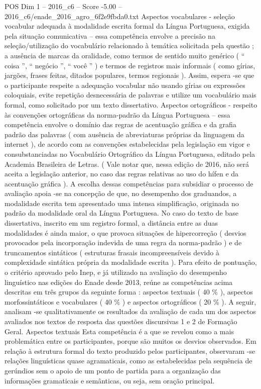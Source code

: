\begin{textsample}{POS Dim 1 – 2016\_c6 – Score -5.00 – 2016\_c6/enade\_2016\_agro\_6f2e9fbda0.txt}
Aspectos vocabulares - seleção vocabular adequada à modalidade escrita formal da Língua Portuguesa, exigida pela situação comunicativa – essa competência envolve a precisão na seleção/utilização do vocabulário relacionado à temática solicitada pela questão ; a ausência de marcas da oralidade, como termos de sentido muito genérico ( “ coisa ”, “ negócio ”, “ você ” ) e termos de registros mais informais ( como gírias, jargões, frases feitas, ditados populares, termos regionais ).
Assim, espera -se que o participante respeite a adequação vocabular não usando gírias ou expressões coloquiais, evite repetição desnecessária de palavras e utilize um vocabulário mais formal, como solicitado por um texto dissertativo.
Aspectos ortográficos - respeito às convenções ortográficas da norma-padrão da Língua Portuguesa – essa competência envolve o domínio das regras de acentuação gráfica e da grafia padrão das palavras ( com ausência de abreviaturas próprias da linguagem da internet ), de acordo com as convenções estabelecidas pela legislação em vigor e consubstanciadas no Vocabulário Ortográfico da Língua Portuguesa, editado pela Academia Brasileira de Letras. ( Vale notar que, nessa edição de 2016, não será aceita a legislação anterior, no caso das regras relativas ao uso do hífen e da acentuação gráfica ).
A escolha dessas competências para subsidiar o processo de avaliação apoia -se na concepção de que, no desempenho dos graduandos, a modalidade escrita tem apresentado uma intensa simplificação, originada no padrão da modalidade oral da Língua Portuguesa.
No caso do texto de base dissertativa, inscrito em um registro formal, a distância entre as duas modalidades é ainda maior, o que provoca situações de hipercorreção ( desvios provocados pela incorporação indevida de uma regra da norma-padrão ) e de truncamentos sintáticos ( estruturas frasais incompreensíveis devido à complexidade sintática própria da modalidade escrita ).
Para efeito de pontuação, o critério aprovado pelo Inep, e já utilizado na avaliação do desempenho linguístico nas edições do Enade desde 2013, reúne as competências acima descritas em três grupos da seguinte forma : aspectos textuais ( 40 \% ), aspectos morfossintáticos e vocabulares ( 40 \% ) e aspectos ortográficos ( 20 \% ).
A seguir, analisam -se qualitativamente os resultados da avaliação de cada um dos aspectos avaliados nos textos de resposta das questões discursivas 1 e 2 de Formação Geral.
Aspectos textuais Esta competência é a que se revelou como a mais problemática entre os participantes, porque são muitos os desvios observados.
Em relação à estrutura formal do texto produzido pelos participantes, observaram -se relações linguísticas quase agramaticais, como as estabelecidas pela sequência de gerúndios sem o apoio de um ponto de partida para a organização das informações gramaticais e semânticas, ou seja, sem oração principal.

\end{textsample}
